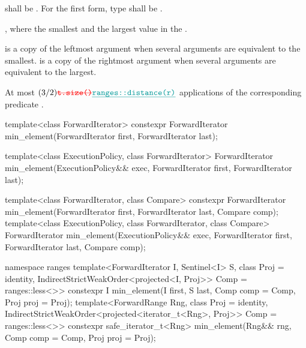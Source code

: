 \begin{itemdescr}
\pnum
\requires
{}  shall be  .
For the first form, type  shall be .

\pnum
\returns {}
,
where    the smallest  and    the
largest value in the  .

\begin{removedblock}
\pnum
\remarks {} is a copy of the leftmost argument when several arguments are equivalent to
the smallest.  is a copy of the rightmost argument when several arguments are
equivalent to the largest.
\end{removedblock}

\pnum
\complexity At most
$(3/2)\tcode{\removed{t.size()}\added{ranges::distance(r)}}$ applications of
the corresponding predicate
.
\end{itemdescr}


%
\begin{itemdecl}
template<class ForwardIterator>
  constexpr ForwardIterator min_element(ForwardIterator first, ForwardIterator last);

template<class ExecutionPolicy, class ForwardIterator>
  ForwardIterator min_element(ExecutionPolicy&& exec,
                              ForwardIterator first, ForwardIterator last);

template<class ForwardIterator, class Compare>
  constexpr ForwardIterator min_element(ForwardIterator first, ForwardIterator last,
                                        Compare comp);
template<class ExecutionPolicy, class ForwardIterator, class Compare>
  ForwardIterator min_element(ExecutionPolicy&& exec,
                              ForwardIterator first, ForwardIterator last,
                              Compare comp);
\end{itemdecl}
\begin{addedblock}
\begin{itemdecl}
namespace ranges {
  template<ForwardIterator I, Sentinel<I> S, class Proj = identity,
      IndirectStrictWeakOrder<projected<I, Proj>> Comp = ranges::less<>>
    constexpr I min_element(I first, S last, Comp comp = Comp{}, Proj proj = Proj{});
  template<ForwardRange Rng, class Proj = identity,
      IndirectStrictWeakOrder<projected<iterator_t<Rng>, Proj>> Comp = ranges::less<>>
    constexpr safe_iterator_t<Rng>
      min_element(Rng&& rng, Comp comp = Comp{}, Proj proj = Proj{});
}
\end{itemdecl}
\end{addedblock}

